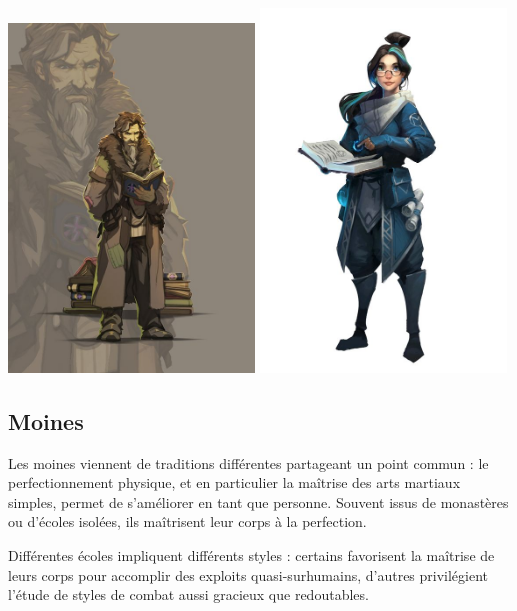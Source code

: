 \documentclass[10pt,a4paper]{book}
\begin{document}
\includegraphics[width=0.49\textwidth]{investigateur 1}
\includegraphics[width=0.49\textwidth]{investigateur 2}
\subsection{Moines}
Les moines viennent de traditions différentes partageant un point commun : le perfectionnement physique, et en particulier la maîtrise des arts martiaux simples, permet de s'améliorer en tant que personne. Souvent issus de monastères ou d'écoles isolées, ils maîtrisent leur corps à la perfection.

Différentes écoles impliquent différents styles : certains favorisent la maîtrise de leurs corps pour accomplir des exploits quasi-surhumains, d'autres privilégient l'étude de styles de combat aussi gracieux que redoutables.
\end{document}
